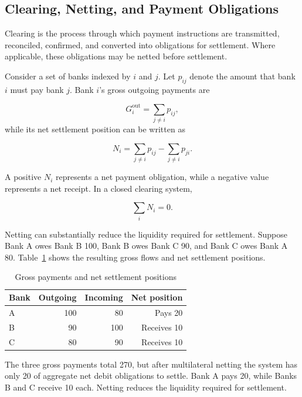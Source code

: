 \subsection{Clearing, Netting, and Payment Obligations}

Clearing is the process through which payment instructions are transmitted, reconciled, confirmed, and converted into obligations for settlement. Where applicable, these obligations may be netted before settlement.

Consider a set of banks indexed by $i$ and $j$. Let $p_{ij}$ denote the amount that bank $i$ must pay bank $j$. Bank $i$'s gross outgoing payments are

\begin{equation}
G_i^{\mathrm{out}}
=\sum_{j\neq i} p_{ij},
\label{eq:ch2-gross-outgoing}
\end{equation}
while its net settlement position can be written as

\begin{equation}
N_i=\sum_{j\neq i} p_{ij}-\sum_{j\neq i} p_{ji}.
\label{eq:ch2-net-position}
\end{equation}

A positive $N_i$  represents a net payment obligation, while a negative value represents a net receipt. In a closed clearing system,

\begin{equation}
\sum_i N_i=0.
\label{eq:ch2-net-zero}
\end{equation}

Netting can substantially reduce the liquidity required for settlement. Suppose Bank A owes Bank B 100, Bank B owes Bank C 90, and Bank C owes Bank A 80. Table~\ref{tab:ch2-netting-example} shows the resulting gross flows and net settlement positions.

\begin{table}[H]
\centering
\caption{Gross payments and net settlement positions}
\label{tab:ch2-netting-example}
\begin{tabular}{@{}lrrr@{}}
\toprule
\textbf{Bank} & \textbf{Outgoing} & \textbf{Incoming} & \textbf{Net position} \\
\midrule
A & 100 & 80 & Pays 20 \\
B & 90 & 100 & Receives 10 \\
C & 80 & 90 & Receives 10 \\
\bottomrule
\end{tabular}
\end{table}

The three gross payments total 270, but after multilateral netting the system has only 20 of aggregate net debit obligations to settle. Bank A pays 20, while Banks B and C receive 10 each. Netting reduces the liquidity required for settlement.

